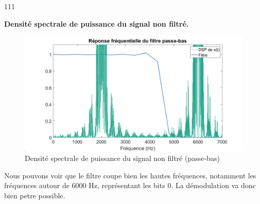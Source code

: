 \begin{dinglist}{111}
\begin{figure}[H]
   \end{figure}
   \item \textbf{Densité spectrale de puissance du signal non filtré.}
   \begin{figure}[H]
      \centering
      \includegraphics[width=\textwidth]{partie-2/sous-partie-3/2.3.3.3.png}
      \caption{Densité spectrale de puissance du signal non filtré (passe-bas)} \label{fig:spb-nn-filtre-bas}
   \end{figure}
   Nous pouvons voir que le filtre coupe bien les hautes fréquences, notamment les fréquences autour de 6000 Hz, représentant les bits 0. La démodulation va donc bien petre possible.


\end{dinglist}
